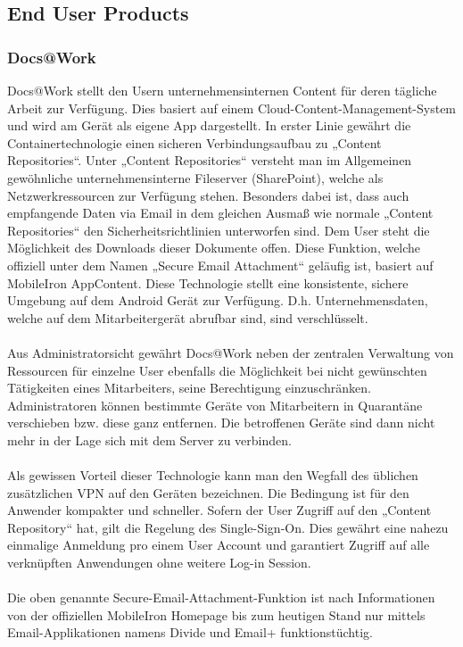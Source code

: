 \subsection{End User Products}
\subsubsection{Docs@Work}
Docs@Work stellt den Usern unternehmensinternen Content für deren tägliche Arbeit zur Verfügung. Dies basiert auf einem Cloud-Content-Management-System und wird am Gerät als eigene App dargestellt. In erster Linie gewährt die Containertechnologie einen sicheren Verbindungsaufbau zu „Content Repositories“. Unter „Content Repositories“ versteht man im Allgemeinen gewöhnliche unternehmensinterne Fileserver (SharePoint), welche als Netzwerkressourcen zur Verfügung stehen. Besonders dabei ist, dass auch empfangende Daten via Email in dem gleichen Ausmaß wie normale „Content Repositories“ den Sicherheitsrichtlinien unterworfen sind. Dem User steht die Möglichkeit des Downloads dieser Dokumente offen. Diese Funktion, welche offiziell unter dem Namen „Secure Email Attachment“ geläufig ist, basiert auf MobileIron AppContent. Diese Technologie stellt eine konsistente, sichere Umgebung auf dem Android Gerät zur Verfügung. D.h. Unternehmensdaten, welche auf dem Mitarbeitergerät abrufbar sind, sind verschlüsselt.
\paragraph*{}
Aus Administratorsicht gewährt Docs@Work neben der zentralen Verwaltung von Ressourcen für einzelne User ebenfalls die Möglichkeit bei nicht gewünschten Tätigkeiten eines Mitarbeiters, seine Berechtigung einzuschränken. Administratoren können bestimmte Geräte von Mitarbeitern in Quarantäne verschieben bzw. diese ganz entfernen. Die betroffenen Geräte sind dann nicht mehr in der Lage sich mit dem Server zu verbinden.
\paragraph*{}
Als gewissen Vorteil dieser Technologie kann man den Wegfall des üblichen zusätzlichen VPN auf den Geräten bezeichnen. Die Bedingung ist für den Anwender kompakter und schneller. Sofern der User Zugriff auf den „Content Repository“ hat, gilt die Regelung des Single-Sign-On. Dies gewährt eine nahezu einmalige Anmeldung pro einem User Account und garantiert Zugriff auf alle verknüpften Anwendungen ohne weitere Log-in Session.
\paragraph*{}
Die oben genannte Secure-Email-Attachment-Funktion ist nach Informationen von der offiziellen MobileIron Homepage bis zum heutigen Stand nur mittels Email-Applikationen namens Divide und Email+ funktionstüchtig.

